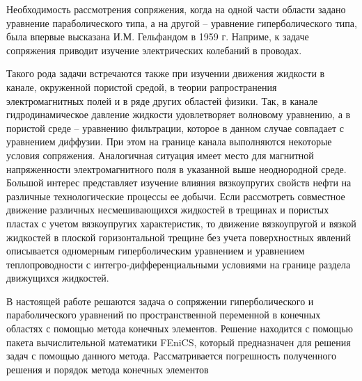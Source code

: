 \newpage

\begin{center}
\end{center}

Необходимость рассмотрения сопряжения, когда на одной части области задано уравнение параболического типа, а на другой -- уравнение гиперболического типа, была впервые высказана И.М. Гельфандом в 1959 г\cite{bib:gelfand}. Наприме, к задаче сопряжения приводит изучение электрических колебаний в проводах.

Такого рода задачи встречаются также при изучении движения жидкости в канале, окруженной пористой средой, в теории рапространения электромагнитных полей и в ряде других областей физики. Так, в канале гидродинамическое давление жидкости удовлетворяет волновому уравнению, а в пористой среде -- уравнению фильтрации, которое в данном случае совпадает с уравнением диффузии\cite{bib:leibezon}. При этом на границе канала выполняются некоторые условия сопряжения. Аналогичная ситуация имеет место для магнитной напряженности электромагнитного поля в указанной выше неоднородной среде\cite{bib:thomas}. Большой интерес представляет изучение влияния вязкоупругих свойств нефти на различные технологические процессы ее добычи. Если рассмотреть совместное движение различных несмешивающихся жидкостей в трещинах и пористых пластах с учетом вязкоупругих характеристик, то движение вязкоупругой и вязкой жидкостей в плоской горизонтальной трещине без учета поверхностных явлений описывается одномерным гиперболическим уравнением и уравнением теплопроводности с интегро-дифференциальными условиями на границе раздела движущихся жидкостей.


В настоящей работе решаются задача о сопряжении гиперболического и параболического уравнений
по пространственной переменной в конечных областях с помощью метода конечных элементов.
Решение находится с помощью пакета вычислительной математики FEniCS, который предназначен для решения задач с помощью данного метода.
Рассматривается погрешность полученного решения и порядок метода конечных элементов


\newpage
